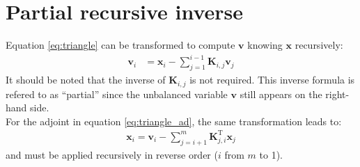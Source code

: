 \documentclass[12pt]{scrartcl}
\begin{document}
\section{Partial recursive inverse}
Equation \eqref{eq:triangle} can be transformed to compute $\mathbf{v}$ knowing $\mathbf{x}$ recursively:
\begin{align}
\label{eq:partial_inverse}
\mathbf{v}_i & = \mathbf{x}_i - \sum_{j=1}^{i-1} \mathbf{K}_{i,j} \mathbf{v}_j
\end{align}
It should be noted that the inverse of $\mathbf{K}_{i,j}$ is not required. This inverse formula is refered to as ``partial'' since the unbalanced variable $\mathbf{v}$ still appears on the right-hand side.\\
$  $\\
For the adjoint in equation \eqref{eq:triangle_ad}, the same transformation leads to:
\begin{align}
\label{eq:partial_inverse_ad}
\mathbf{x}_i = \mathbf{v}_i - \sum_{j=i+1}^{m} \mathbf{K}^\mathrm{T}_{j,i} \mathbf{x}_j
\end{align}
and must be applied recursively in reverse order ($i$ from $m$ to 1).
\end{document}
